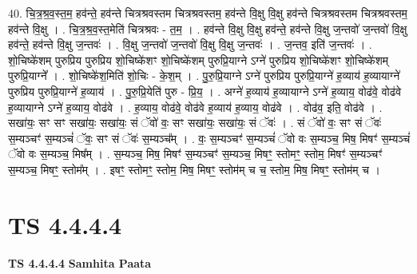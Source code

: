 \documentclass[17pt]{extarticle}
\begin{document}
40. चि॒त्र॒श्र॒व॒स्त॒म॒ हव॑न्ते॒ हव॑न्ते चित्रश्रवस्तम चित्रश्रवस्तम॒ हव॑न्ते वि॒क्षु वि॒क्षु हव॑न्ते चित्रश्रवस्तम चित्रश्रवस्तम॒ हव॑न्ते वि॒क्षु । . चि॒त्र॒श्र॒व॒स्त॒मेति॑ चित्रश्रवः - त॒म॒ । . हव॑न्ते वि॒क्षु वि॒क्षु हव॑न्ते॒ हव॑न्ते वि॒क्षु ज॒न्तवो॑ ज॒न्तवो॑ वि॒क्षु हव॑न्ते॒ हव॑न्ते वि॒क्षु ज॒न्तवः॑ । . वि॒क्षु ज॒न्तवो॑ ज॒न्तवो॑ वि॒क्षु वि॒क्षु ज॒न्तवः॑ । . ज॒न्तव॒ इति॑ ज॒न्तवः॑ । . शो॒चिष्के॑शम् पुरुप्रिय पुरुप्रिय शो॒चिष्के॑शꣳ शो॒चिष्के॑शम् पुरुप्रि॒याग्ने ऽग्ने॑ पुरुप्रिय शो॒चिष्के॑शꣳ शो॒चिष्के॑शम् पुरुप्रि॒याग्ने᳚ । . शो॒चिष्के॑श॒मिति॑ शो॒चिः - के॒श॒म् । . पु॒रु॒प्रि॒याग्ने ऽग्ने॑ पुरुप्रिय पुरुप्रि॒याग्ने॑ ह॒व्याय॑ ह॒व्यायाग्ने॑ पुरुप्रिय पुरुप्रि॒याग्ने॑ ह॒व्याय॑ । . पु॒रु॒प्रि॒येति॑ पुरु - प्रि॒य॒ । . अग्ने॑ ह॒व्याय॑ ह॒व्यायाग्ने ऽग्ने॑ ह॒व्याय॒ वोढ॑वे॒ वोढ॑वे ह॒व्यायाग्ने ऽग्ने॑ ह॒व्याय॒ वोढ॑वे । . ह॒व्याय॒ वोढ॑वे॒ वोढ॑वे ह॒व्याय॑ ह॒व्याय॒ वोढ॑वे । . वोढ॑व॒ इति॒ वोढ॑वे । . सखा॑यः॒ सꣳ सꣳ सखा॑यः॒ सखा॑यः॒ सं ॅवो॑ वः॒ सꣳ सखा॑यः॒ सखा॑यः॒ सं ॅवः॑ । . सं ॅवो॑ वः॒ सꣳ सं ॅवः॑ स॒म्यञ्चꣳ॑ स॒म्यञ्चं॑ ॅवः॒ सꣳ सं ॅवः॑ स॒म्यञ्च᳚म् । . वः॒ स॒म्यञ्चꣳ॑ स॒म्यञ्चं॑ ॅवो वः स॒म्यञ्च॒ मिष॒ मिषꣳ॑ स॒म्यञ्चं॑ ॅवो वः स॒म्यञ्च॒ मिष᳚म् । . स॒म्यञ्च॒ मिष॒ मिषꣳ॑ स॒म्यञ्चꣳ॑ स॒म्यञ्च॒ मिषꣳ॒॒ स्तोमꣳ॒॒ स्तोम॒ मिषꣳ॑ स॒म्यञ्चꣳ॑ स॒म्यञ्च॒ मिषꣳ॒॒ स्तोम᳚म् । . इषꣳ॒॒ स्तोमꣳ॒॒ स्तोम॒ मिष॒ मिषꣳ॒॒ स्तोम॑म् च च॒ स्तोम॒ मिष॒ मिषꣳ॒॒ स्तोम॑म् च । \newline
\pagebreak
{}

\section{ TS 4.4.4.4 }

\textbf{TS 4.4.4.4 } \newline
\textbf{Samhita Paata} \newline
\end{document}
